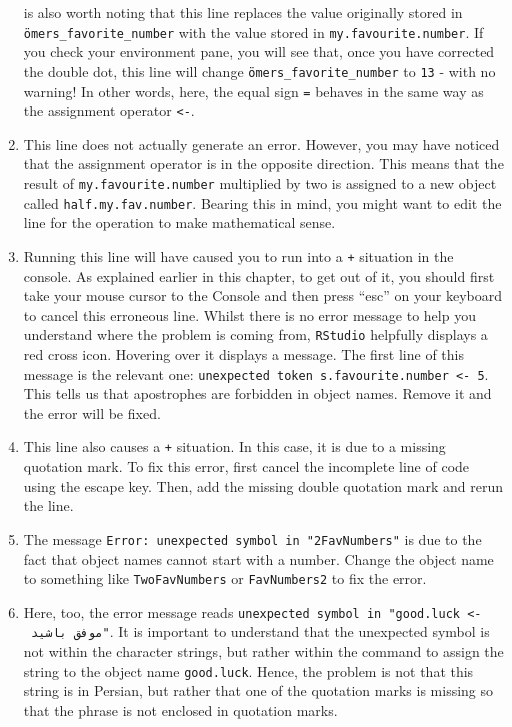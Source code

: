 \documentclass[
  letterpaper,
  DIV=11,
  numbers=noendperiod,
  oneside]{scrreprt}
\begin{document}
\begin{tcolorbox}
\begin{enumerate}
  is also worth noting that this line replaces the value originally
  stored in \texttt{ömers\_favorite\_number} with the value stored in
  \texttt{my.favourite.number}. If you check your environment pane, you
  will see that, once you have corrected the double dot, this line will
  change \texttt{ömers\_favorite\_number} to \texttt{13} - with no
  warning! In other words, here, the equal sign \texttt{=} behaves in
  the same way as the assignment operator \texttt{\textless{}-}.
\item
  This line does not actually generate an error. However, you may have
  noticed that the assignment operator is in the opposite direction.
  This means that the result of \texttt{my.favourite.number} multiplied
  by two is assigned to a new object called \texttt{half.my.fav.number}.
  Bearing this in mind, you might want to edit the line for the
  operation to make mathematical sense.
\item
  Running this line will have caused you to run into a \texttt{+}
  situation in the console. As explained earlier in this chapter, to get
  out of it, you should first take your mouse cursor to the Console and
  then press ``esc'' on your keyboard to cancel this erroneous line.
  Whilst there is no error message to help you understand where the
  problem is coming from, \texttt{RStudio} helpfully displays a red
  cross icon. Hovering over it displays a message. The first line of
  this message is the relevant one:
  \texttt{unexpected\ token\ \textquotesingle{}s.favourite.number\ \textless{}-\ 5}.
  This tells us that apostrophes are forbidden in object names. Remove
  it and the error will be fixed.
\item
  This line also causes a \texttt{+} situation. In this case, it is due
  to a missing quotation mark. To fix this error, first cancel the
  incomplete line of code using the escape key. Then, add the missing
  double quotation mark and rerun the line.
\item
  The message \texttt{Error:\ unexpected\ symbol\ in\ "2FavNumbers"} is
  due to the fact that object names cannot start with a number. Change
  the object name to something like \texttt{TwoFavNumbers} or
  \texttt{FavNumbers2} to fix the error.
\item
  Here, too, the error message reads
  \texttt{unexpected\ symbol\ in\ "good.luck\ \textless{}-\ موفق\ باشيد"}.
  It is important to understand that the unexpected symbol is not within
  the character strings, but rather within the command to assign the
  string to the object name \texttt{good.luck}. Hence, the problem is
  not that this string is in Persian, but rather that one of the
  quotation marks is missing so that the phrase is not enclosed in
  quotation marks.
\end{enumerate}

\end{tcolorbox}
\end{document}
